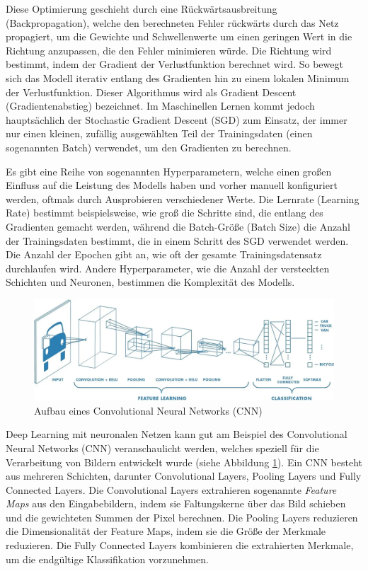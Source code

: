 Diese Optimierung geschieht durch eine Rückwärtsausbreitung (Backpropagation), welche den berechneten Fehler rückwärts durch das Netz propagiert, um die Gewichte und Schwellenwerte um einen geringen Wert in die Richtung anzupassen, die den Fehler minimieren würde. Die Richtung wird bestimmt, indem der Gradient der Verlustfunktion berechnet wird. So bewegt sich das Modell iterativ entlang des Gradienten hin zu einem lokalen Minimum der Verlustfunktion. Dieser Algorithmus wird als Gradient Descent (Gradientenabstieg) bezeichnet. Im Maschinellen Lernen kommt jedoch hauptsächlich der Stochastic Gradient Descent (SGD) zum Einsatz, der immer nur einen kleinen, zufällig ausgewählten Teil der Trainingsdaten (einen sogenannten Batch) verwendet, um den Gradienten zu berechnen. %

Es gibt eine Reihe von sogenannten Hyperparametern, welche einen großen Einfluss auf die Leistung des Modells haben und vorher manuell konfiguriert werden, oftmals durch Ausprobieren verschiedener Werte. Die Lernrate (Learning Rate) bestimmt beispielsweise, wie groß die Schritte sind, die entlang des Gradienten gemacht werden, während die Batch-Größe (Batch Size) die Anzahl der Trainingsdaten bestimmt, die in einem Schritt des SGD verwendet werden. Die Anzahl der Epochen gibt an, wie oft der gesamte Trainingsdatensatz durchlaufen wird. Andere Hyperparameter, wie die Anzahl der versteckten Schichten und Neuronen, bestimmen die Komplexität des Modells.

\begin{figure}[h]
	\centering
	\includegraphics[width=\textwidth]{figure_cnn.png} %
	\caption{Aufbau eines Convolutional Neural Networks (CNN)}
	\label{fig:cnn}
\end{figure}

Deep Learning mit neuronalen Netzen kann gut am Beispiel des Convolutional Neural Networks (CNN) veranschaulicht werden, welches speziell für die Verarbeitung von Bildern entwickelt wurde (siehe Abbildung \ref{fig:cnn}). Ein CNN besteht aus mehreren Schichten, darunter Convolutional Layers, Pooling Layers und Fully Connected Layers. Die Convolutional Layers extrahieren sogenannte \textit{Feature Maps} aus den Eingabebildern, indem sie Faltungskerne über das Bild schieben und die gewichteten Summen der Pixel berechnen. Die Pooling Layers reduzieren die Dimensionalität der Feature Maps, indem sie die Größe der Merkmale reduzieren. Die Fully Connected Layers kombinieren die extrahierten Merkmale, um die endgültige Klassifikation vorzunehmen.

